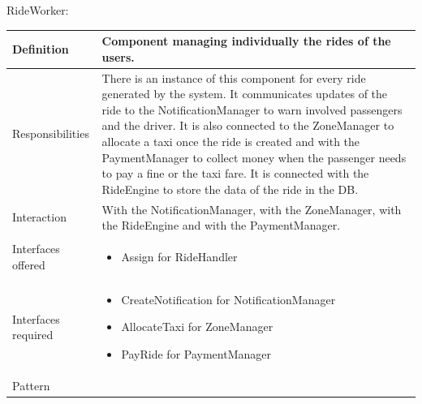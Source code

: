 \documentclass[a4paper,11pt]{report} %
\begin{document}
	\vspace*{0.35cm}
	\centerline{RideWorker:}
	\begin{center}
		\begin{tabular}{| l | p{9cm} |}\hline
			Definition & Component managing individually the rides of the users.\\\hline
			Responsibilities & There is an instance of this component for every ride generated by the system. It communicates updates of the ride to the NotificationManager to warn involved passengers and the driver. It is also connected to the ZoneManager to allocate a taxi once the ride is created and with the PaymentManager to collect money when the passenger needs to pay a fine or the taxi fare. It is connected with the RideEngine to store the data of the ride in the DB.\\\hline
			Interaction & With the NotificationManager, with the ZoneManager, with the RideEngine and with the PaymentManager.\\\hline
			Interfaces offered & \begin{itemize}
				\item Assign for RideHandler
			\end{itemize}\\\hline
			Interfaces required & \begin{itemize}
				\item CreateNotification for NotificationManager
				\item AllocateTaxi for ZoneManager
				\item PayRide for PaymentManager
			\end{itemize}\\\hline
			Pattern & \\\hline
		\end{tabular}
	\end{center}	
	
	\pagebreak
\end{document}
